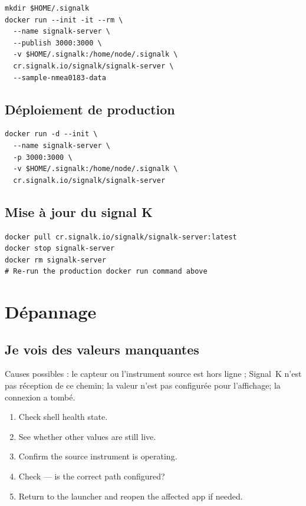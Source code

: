\begin{lstlisting}
mkdir $HOME/.signalk
docker run --init -it --rm \
  --name signalk-server \
  --publish 3000:3000 \
  -v $HOME/.signalk:/home/node/.signalk \
  cr.signalk.io/signalk/signalk-server \
  --sample-nmea0183-data
\end{lstlisting}

\section{Déploiement de production}

\begin{lstlisting}
docker run -d --init \
  --name signalk-server \
  -p 3000:3000 \
  -v $HOME/.signalk:/home/node/.signalk \
  cr.signalk.io/signalk/signalk-server
\end{lstlisting}

\section{Mise à jour du signal K}

\begin{lstlisting}
docker pull cr.signalk.io/signalk/signalk-server:latest
docker stop signalk-server
docker rm signalk-server
# Re-run the production docker run command above
\end{lstlisting}

\chapter{Dépannage}
\label{ch:troubleshooting}

\section{Je vois des valeurs manquantes}

Causes possibles : le capteur ou l'instrument source est hors ligne ; Signal~K n'est pas
réception de ce chemin; la valeur n'est pas configurée pour l'affichage; la connexion a
tombé.

\begin{enumerate}
  \item Check shell health state.
  \item See whether other values are still live.
  \item Confirm the source instrument is operating.
  \item Check  --- is the correct path configured?
  \item Return to the launcher and reopen the affected app if needed.
\end{enumerate}

